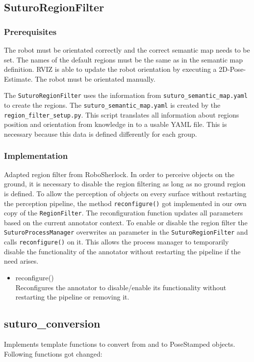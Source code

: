 \documentclass[main.tex]{subfiles}
\begin{document}
\subsection{SuturoRegionFilter}
\subsubsection{Prerequisites}
The robot must be orientated correctly and the correct semantic map needs to be set.
The names of the default regions must be the same as in the semantic map definition.
RVIZ is able to update the robot orientation by executing a 2D-Pose-Estimate. The robot must be orientated manually.

The \texttt{SuturoRegionFilter} uses the information from \texttt{suturo\_semantic\_map.yaml} to create the regions. 
The \texttt{suturo\_semantic\_map.yaml} is created by the \texttt{region\_filter\_setup.py}. 
This script translates all information about regions position and orientation from knowledge in to a usable YAML file. 
This is necessary because this data is defined differently for each group.

\subsubsection{Implementation}
Adapted region filter from RoboSherlock. In order to perceive objects on the ground, it is necessary to disable
the region filtering as long as no ground region is defined. To allow the perception of objects on every surface
without restarting the perception pipeline, the method \texttt{reconfigure()} got implemented in our own copy of the 
\texttt{RegionFilter}. The reconfiguration function updates all parameters based on the current annotator context.
To enable or disable the region filter the \texttt{SuturoProcessManager} overwrites an parameter in the \texttt{SuturoRegionFilter}
and calls \texttt{reconfigure()} on it. 
This allows the process manager to temporarily disable the functionality of the annotator without restarting the pipeline if the need arises.

\begin{itemize}
\item reconfigure()\\
Reconfigures the annotator to disable/enable its functionality without restarting the pipeline or removing it.
\end{itemize}

\subsection{suturo\_conversion}
Implements template functions to convert from and to PoseStamped objects.
Following functions got changed:
\end{document}

